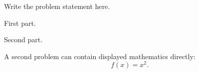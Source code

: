 \documentclass[11pt]{article}
\begin{document}
\makeassignmenttitle

\begin{problem}[10]
Write the problem statement here.

\begin{subproblems}
  \item {} First part.
  \item {} Second part.
\end{subproblems}
\end{problem}

\begin{problem}[10]
A second problem can contain displayed mathematics directly:
\[
  f(x)=x^2.
\]
\end{problem}
\end{document}
